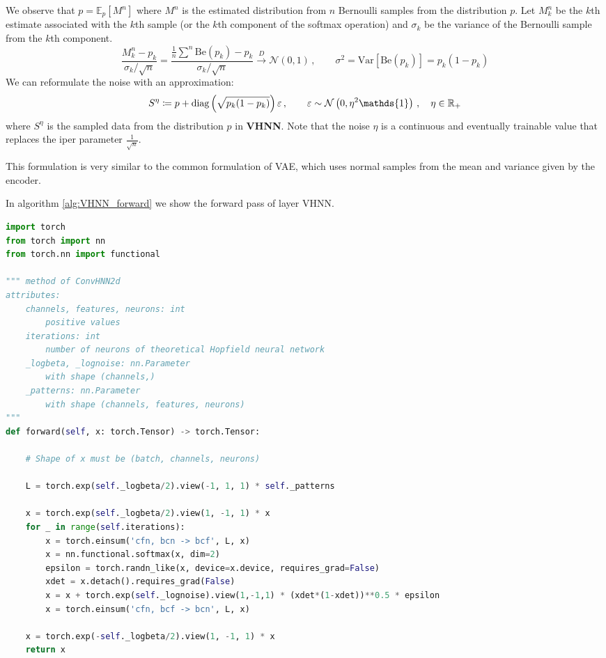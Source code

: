 \noindent We observe that $p = \mathbb{E}_p\left[M^n\right]$ where $M^n$ is the estimated distribution from $n$ Bernoulli samples from the distribution $p$. Let $M^n_k$ be the $k$th estimate associated with the $k$th sample (or the $k$th component of the softmax operation) and $\sigma_k$ be the variance of the Bernoulli sample from the $k$th component.
\[
\frac{M_k^n - p_k}{\sigma_k / \sqrt{n}} = \frac{\frac{1}{n}\sum^n \text{Be}(p_k) - p_k}{\sigma_k / \sqrt{n}} \overset{D}{\to} \mathcal{N}\left(0,1\right)\,,\quad \quad \sigma^2 = \text{Var}\left[\text{Be}(p_k)\right] = p_k(1-p_k)
\]
We can reformulate the noise with an approximation:
\[
S^\eta \mathdef p + \text{diag}\left(\sqrt{p_k(1-p_k)}\right)\varepsilon\,, \quad \quad \varepsilon \sim \mathcal{N}\left(0,\eta^2\mathds{1}\right)\,,\quad \eta\in\mathbb{R}_+
\]
where $S^\eta$ is the sampled data from the distribution $p$ in \textbf{VHNN}. Note that the noise $\eta$ is a continuous and eventually trainable value that replaces the iper parameter $\frac{1}{\sqrt{n}}$.

\noindent This formulation is very similar to the common formulation of VAE, which uses normal samples from the mean and variance given by the encoder.

\noindent In algorithm \ref{alg:VHNN_forward} we show the forward pass of layer VHNN.

\begin{lstlisting}[style=code, label=alg:VHNN_forward, caption=VHNN forward pass, language=Python]
import torch
from torch import nn
from torch.nn import functional

""" method of ConvHNN2d
attributes:
    channels, features, neurons: int
        positive values
    iterations: int
        number of neurons of theoretical Hopfield neural network
    _logbeta, _lognoise: nn.Parameter
        with shape (channels,)
    _patterns: nn.Parameter
        with shape (channels, features, neurons)
"""
def forward(self, x: torch.Tensor) -> torch.Tensor:

    # Shape of x must be (batch, channels, neurons)

    L = torch.exp(self._logbeta/2).view(-1, 1, 1) * self._patterns

    x = torch.exp(self._logbeta/2).view(1, -1, 1) * x
    for _ in range(self.iterations):
        x = torch.einsum('cfn, bcn -> bcf', L, x)
        x = nn.functional.softmax(x, dim=2)
        epsilon = torch.randn_like(x, device=x.device, requires_grad=False)
        xdet = x.detach().requires_grad(False)
        x = x + torch.exp(self._lognoise).view(1,-1,1) * (xdet*(1-xdet))**0.5 * epsilon
        x = torch.einsum('cfn, bcf -> bcn', L, x)

    x = torch.exp(-self._logbeta/2).view(1, -1, 1) * x
    return x
\end{lstlisting}

